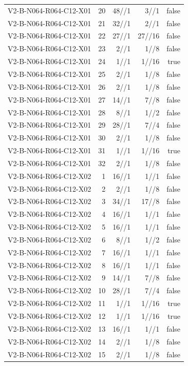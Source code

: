 {\begin{longtable}{lrrrr}
V2-B-N064-R064-C12-X01 & 20 & 48//1 & 3//1 & false \\
V2-B-N064-R064-C12-X01 & 21 & 32//1 & 2//1 & false \\
V2-B-N064-R064-C12-X01 & 22 & 27//1 & 27//16 & false \\
V2-B-N064-R064-C12-X01 & 23 & 2//1 & 1//8 & false \\
V2-B-N064-R064-C12-X01 & 24 & 1//1 & 1//16 & true \\
V2-B-N064-R064-C12-X01 & 25 & 2//1 & 1//8 & false \\
V2-B-N064-R064-C12-X01 & 26 & 2//1 & 1//8 & false \\
V2-B-N064-R064-C12-X01 & 27 & 14//1 & 7//8 & false \\
V2-B-N064-R064-C12-X01 & 28 & 8//1 & 1//2 & false \\
V2-B-N064-R064-C12-X01 & 29 & 28//1 & 7//4 & false \\
V2-B-N064-R064-C12-X01 & 30 & 2//1 & 1//8 & false \\
V2-B-N064-R064-C12-X01 & 31 & 1//1 & 1//16 & true \\
V2-B-N064-R064-C12-X01 & 32 & 2//1 & 1//8 & false \\
V2-B-N064-R064-C12-X02 & 1 & 16//1 & 1//1 & false \\
V2-B-N064-R064-C12-X02 & 2 & 2//1 & 1//8 & false \\
V2-B-N064-R064-C12-X02 & 3 & 34//1 & 17//8 & false \\
V2-B-N064-R064-C12-X02 & 4 & 16//1 & 1//1 & false \\
V2-B-N064-R064-C12-X02 & 5 & 16//1 & 1//1 & false \\
V2-B-N064-R064-C12-X02 & 6 & 8//1 & 1//2 & false \\
V2-B-N064-R064-C12-X02 & 7 & 16//1 & 1//1 & false \\
V2-B-N064-R064-C12-X02 & 8 & 16//1 & 1//1 & false \\
V2-B-N064-R064-C12-X02 & 9 & 14//1 & 7//8 & false \\
V2-B-N064-R064-C12-X02 & 10 & 28//1 & 7//4 & false \\
V2-B-N064-R064-C12-X02 & 11 & 1//1 & 1//16 & true \\
V2-B-N064-R064-C12-X02 & 12 & 1//1 & 1//16 & true \\
V2-B-N064-R064-C12-X02 & 13 & 16//1 & 1//1 & false \\
V2-B-N064-R064-C12-X02 & 14 & 2//1 & 1//8 & false \\
V2-B-N064-R064-C12-X02 & 15 & 2//1 & 1//8 & false \\

\end{longtable}}
